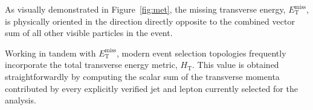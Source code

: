 As visually demonstrated in Figure~\ref{fig:met}, the missing transverse energy, $E_{\text{T}}^{\text{miss}}$, is physically oriented in the direction directly opposite to the combined vector sum of all other visible particles in the event.

Working in tandem with $E_{\text{T}}^{\text{miss}}$, modern event selection topologies frequently incorporate the total transverse energy metric, $H_{\text{T}}$. This value is obtained straightforwardly by computing the scalar sum of the transverse momenta contributed by every explicitly verified jet and lepton currently selected for the analysis.